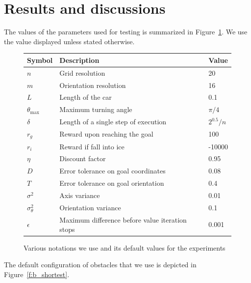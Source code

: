 \documentclass[a4paper]{article}
\begin{document}
\section{Results and discussions}

The values of the parameters used for testing is summarized in Figure~\ref{f:notations}.
We use the value displayed unless stated otherwise.

\begin{figure}
\caption{Various notations we use and its default values for the experiments}
\label{f:notations}
\begin{tabular}{ l | l | l }
  Symbol & Description & Value \\ \hline \hline
  $n$ & Grid resolution & 20 \\ \hline
  $m$ & Orientation resolution & 16 \\ \hline
  $L$ & Length of the car & 0.1 \\ \hline
  $\theta_{\text{max}}$ & Maximum turning angle & $\pi / 4$ \\ \hline
  $\delta$ & Length of a single step of execution & $2^{0.5} / n$ \\ \hline
  $r_g$ & Reward upon reaching the goal & 100 \\ \hline
  $r_i$ & Reward if fall into ice & -10000 \\ \hline
  $\eta$ & Discount factor & 0.95 \\ \hline
  $D$ & Error tolerance on goal coordinates & 0.08 \\ \hline
  $T$ & Error tolerance on goal orientation & 0.4 \\ \hline
  $\sigma^2$ & Axis variance & 0.01 \\ \hline
  $\sigma_\theta^2$ & Orientation variance & 0.1 \\ \hline
  $\epsilon$ & Maximum difference before value iteration stops & 0.001 \\ \hline
\end{tabular}
\end{figure}

The default configuration of obstacles that we use is depicted in
Figure~\ref{f:b_shortest}.
\end{document}
